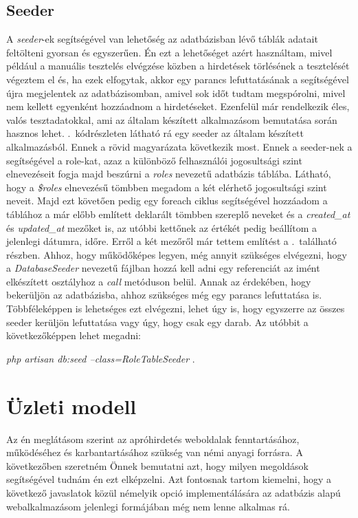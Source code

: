\documentclass[]{thesis-ekf}
\theoremstyle{definition}
\theoremstyle{remark}
\begin{document}
	\section{Seeder}
		A \emph{seeder}-ek segítségével van lehetőség az adatbázisban lévő táblák adatait feltölteni gyorsan és egyszerűen. Én ezt a lehetőséget azért használtam, mivel például a manuális tesztelés elvégzése közben a hirdetések törlésének a tesztelését végeztem el és, ha ezek elfogytak, akkor egy parancs lefuttatásának a segítségével újra megjelentek az adatbázisomban, amivel sok időt tudtam megspórolni, mivel nem kellett egyenként hozzáadnom a hirdetéseket. Ezenfelül már rendelkezik éles, valós tesztadatokkal, ami az általam készített alkalmazásom bemutatása során hasznos lehet. .~kódrészleten látható rá egy seeder az általam készített alkalmazásból. Ennek a rövid magyarázata következik most. Ennek a seeder-nek a segítségével a role-kat, azaz a különböző felhasználói jogosultsági szint elnevezéseit fogja majd beszúrni a \emph{roles} nevezetű adatbázis táblába. Látható, hogy a \emph{\$roles} elnevezésű tömbben megadom a két elérhető jogosultsági szint neveit. Majd ezt követően pedig egy foreach ciklus segítségével hozzáadom a táblához a már előbb említett deklarált tömbben szereplő neveket és a \emph{created\_at} és \emph{updated\_at} mezőket is, az utóbbi kettőnek az értékét pedig beállítom a jelenlegi dátumra, időre. Erről a két mezőről már tettem említést a .~található részben. Ahhoz, hogy működőképes legyen, még annyit szükséges elvégezni, hogy a \emph{DatabaseSeeder} nevezetű fájlban hozzá kell adni egy referenciát az imént elkészített osztályhoz a \emph{call} metóduson belül. Annak az érdekében, hogy bekerüljön az adatbázisba, ahhoz szükséges még egy parancs lefuttatása is. Többféleképpen is lehetséges ezt elvégezni, lehet úgy is, hogy egyszerre az összes seeder kerüljön lefuttatása vagy úgy, hogy csak egy darab. Az utóbbit a következőképpen lehet megadni:
		\begin{center}
			\emph{php artisan db:seed --class=RoleTableSeeder} .
		\end{center}
		
		
		
	\chapter{Üzleti modell}
		Az én meglátásom szerint az apróhirdetés weboldalak fenntartásához, működéséhez és karbantartásához szükség van némi anyagi forrásra. A következőben szeretném Önnek bemutatni azt, hogy milyen megoldások segítségével tudnám én ezt elképzelni. Azt fontosnak tartom kiemelni, hogy a következő javaslatok közül némelyik opció implementálására az adatbázis alapú webalkalmazásom jelenlegi formájában még nem lenne alkalmas rá.
\end{document}
